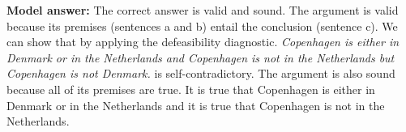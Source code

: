 \documentclass[a4,11pt]{article}
\begin{document}
\begin{enumerate}[leftmargin = 12pt]
 {\bf Model answer:} The correct answer is valid and sound. The argument is valid because its premises (sentences a and b) entail the conclusion (sentence c). We can show that by applying the defeasibility diagnostic. {\em Copenhagen is either in Denmark or in the Netherlands and Copenhagen is not in the Netherlands but Copenhagen is not Denmark.} is self-contradictory. The argument is also sound because all of its premises are true. It is true that Copenhagen is either in Denmark or in the Netherlands and it is true that Copenhagen is not in the Netherlands. 
 


\end{enumerate}
\end{document}

